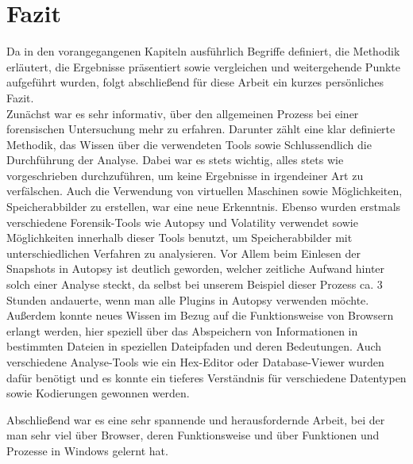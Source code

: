 \chapter{Fazit}

Da in den vorangegangenen Kapiteln ausführlich Begriffe definiert, die Methodik erläutert, die Ergebnisse präsentiert sowie vergleichen und weitergehende Punkte aufgeführt wurden, folgt abschließend für diese Arbeit ein kurzes persönliches Fazit. \\
Zunächst war es sehr informativ, über den allgemeinen Prozess bei einer forensischen Untersuchung mehr zu erfahren. Darunter zählt eine klar definierte Methodik, das Wissen über die verwendeten Tools sowie Schlussendlich die Durchführung der Analyse. Dabei war es stets wichtig, alles stets wie vorgeschrieben durchzuführen, um keine Ergebnisse in irgendeiner Art zu verfälschen. Auch die Verwendung von virtuellen Maschinen sowie Möglichkeiten, Speicherabbilder zu erstellen, war eine neue Erkenntnis. Ebenso wurden erstmals verschiedene Forensik-Tools wie Autopsy und Volatility verwendet sowie Möglichkeiten innerhalb dieser Tools benutzt, um Speicherabbilder mit unterschiedlichen Verfahren zu analysieren. Vor Allem beim Einlesen der Snapshots in Autopsy ist deutlich geworden, welcher zeitliche Aufwand hinter solch einer Analyse steckt, da selbst bei unserem Beispiel dieser Prozess ca. 3 Stunden andauerte, wenn man alle Plugins in Autopsy verwenden möchte. Außerdem konnte neues Wissen im Bezug auf die Funktionsweise von Browsern erlangt werden, hier speziell über das Abspeichern von Informationen in bestimmten Dateien in speziellen Dateipfaden und deren Bedeutungen. Auch verschiedene Analyse-Tools wie ein Hex-Editor oder Database-Viewer wurden dafür benötigt und es konnte ein tieferes Verständnis für verschiedene Datentypen sowie Kodierungen gewonnen werden. 

Abschließend war es eine sehr spannende und herausfordernde Arbeit, bei der man sehr viel über Browser, deren Funktionsweise und über Funktionen und Prozesse in Windows gelernt hat. 
